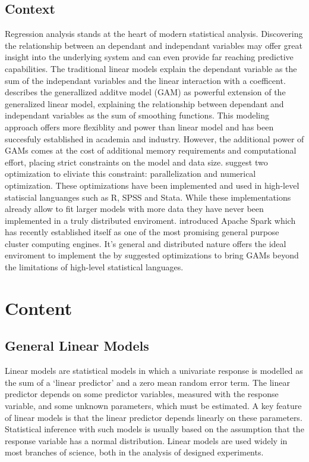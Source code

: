 \documentclass{article}
\begin{document}
    \subsection{Context}
    Regression analysis stands at the heart of modern statistical analysis. Discovering the relationship between an dependant and independant variables may offer great insight into the underlying system and can even provide far reaching predictive capabilities. The traditional linear models explain the dependant variable as the sum of the independant variables and the linear interaction with a coefficent.\cite{gamBook} describes the generallized additve model (GAM) as powerful extension of the generalized linear model, explaining the relationship between dependant and independant variables as the sum of smoothing functions. This modeling approach offers more flexiblity and power than linear model and has been succesfuly established in academia and industry. However, the additional power of GAMs comes at the cost of additional memory requirements and computational effort, placing strict constraints on the model and data size.\cite{bigdataGAM} suggest two optimization to eliviate this constraint: parallelization and numerical optimization.
    These optimizations have been implemented and used in high-level statiscial languanges such as R, SPSS and Stata. While these implementations already allow to fit larger models with more data they have never been implemented in a truly distributed enviroment.\cite{spark} introduced Apache Spark which has recently established itself as one of the most promising general purpose cluster computing engines. It's general and distributed nature offers the ideal enviroment to implement the by \cite{bigdataGAM} suggested optimizations to bring GAMs beyond the limitations of high-level statistical languages.



    \section{Content}
    \subsection{General Linear Models}
    Linear models are statistical models in which a univariate response is modelled as the sum of a ‘linear predictor’ and a zero mean random error term. The linear predictor depends on some predictor variables, measured with the response variable, and some unknown parameters, which must be estimated. A key feature of linear models is that the linear predictor depends linearly on these parameters. Statistical inference with such models is usually based on the assumption that the response variable has a normal distribution. Linear models are used widely in most branches of science, both in the analysis of designed experiments. \
\end{document}
